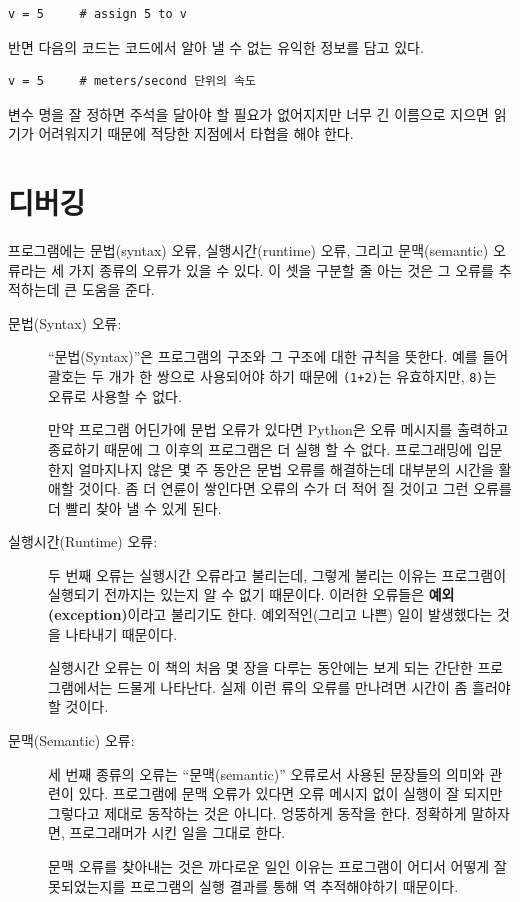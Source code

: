 \documentclass[10pt]{book}
\begin{document}
\begin{verbatim}
v = 5     # assign 5 to v
\end{verbatim}
%
반면 다음의 코드는 코드에서 알아 낼 수 없는 유익한 정보를 담고 있다. 

\begin{verbatim}
v = 5     # meters/second 단위의 속도 
\end{verbatim}
%
변수 명을 잘 정하면 주석을 달아야 할 필요가 없어지지만 너무 긴 이름으로
지으면 읽기가 어려워지기 때문에 적당한 지점에서 타협을 해야 한다.


\section{디버깅}


프로그램에는 문법(syntax) 오류, 실행시간(runtime) 오류, 그리고
문맥(semantic) 오류라는 세 가지 종류의 오류가 있을 수 있다.  이 셋을
구분할 줄 아는 것은 그 오류를 추적하는데 큰 도움을 준다.


\begin{description}

\item[문법(Syntax) 오류:] ``문법(Syntax)''은 프로그램의 구조와 그
  구조에 대한 규칙을 뜻한다. 예를 들어 괄호는 두 개가 한 쌍으로
  사용되어야 하기 때문에 {\tt (1+2)}는 유효하지만, {\tt 8)}는 {
    오류}로 사용할 수 없다.

  만약 프로그램 어딘가에 문법 오류가 있다면 Python은 오류 메시지를
  출력하고 종료하기 때문에 그 이후의 프로그램은 더 실행 할 수 없다.
  프로그래밍에 입문한지 얼마지나지 않은 몇 주 동안은 문법 오류를
  해결하는데 대부분의 시간을 활애할 것이다.  좀 더 연륜이 쌓인다면
  오류의 수가 더 적어 질 것이고 그런 오류를 더 빨리 찾아 낼 수 있게 된다.


\item[실행시간(Runtime) 오류:] 두 번째 오류는 실행시간 오류라고
  불리는데, 그렇게 불리는 이유는 프로그램이 실행되기 전까지는 있는지 알
  수 없기 때문이다.  이러한 오류들은 {\bf 예외(exception)}이라고
  불리기도 한다.  예외적인(그리고 나쁜) 일이 발생했다는 것을 나타내기
  때문이다.   
    

  실행시간 오류는 이 책의 처음 몇 장을 다루는 동안에는 보게 되는 간단한
  프로그램에서는 드물게 나타난다.  실제 이런 류의 오류를 만나려면
  시간이 좀 흘러야 할 것이다.


\item[문맥(Semantic) 오류:] 세 번째 종류의 오류는 ``문맥(semantic)''
  오류로서 사용된 문장들의 의미와 관련이 있다.  프로그램에 문맥 오류가
  있다면 오류 메시지 없이 실행이 잘 되지만 그렇다고 제대로 동작하는
  것은 아니다.  엉뚱하게 동작을 한다.  정확하게 말하자면, 프로그래머가
  시킨 일을 그대로 한다.  
   

  문맥 오류를 찾아내는 것은 까다로운 일인 이유는 프로그램이 어디서
  어떻게 잘못되었는지를 프로그램의 실행 결과를 통해 역 추적해야하기
  때문이다.

\end{description}
\end{document}
